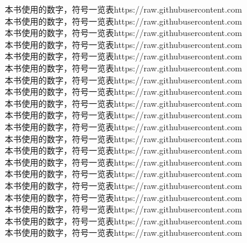 {\cjk\mktsFontfileFlowdejavusansmono{}本书使用的数字，符号一览表https://raw.githubusercontent.com}\\
{\cjk\mktsFontfileHanamina{}本书使用的数字，符号一览表https://raw.githubusercontent.com}\\
{\cjk\mktsFontfileHanaminb{}本书使用的数字，符号一览表https://raw.githubusercontent.com}\\
{\cjk\mktsFontfileSunexta{}本书使用的数字，符号一览表https://raw.githubusercontent.com}\\
{\cjk\mktsFontfileSunextb{}本书使用的数字，符号一览表https://raw.githubusercontent.com}\\
{\cjk\mktsFontfileSunflowerucjkxb{}本书使用的数字，符号一览表https://raw.githubusercontent.com}\\
{\cjk\mktsFontfileUbuntub{}本书使用的数字，符号一览表https://raw.githubusercontent.com}\\
{\cjk\mktsFontfileUbuntubi{}本书使用的数字，符号一览表https://raw.githubusercontent.com}\\
{\cjk\mktsFontfileUbuntuc{}本书使用的数字，符号一览表https://raw.githubusercontent.com}\\
{\cjk\mktsFontfileUbuntul{}本书使用的数字，符号一览表https://raw.githubusercontent.com}\\
{\cjk\mktsFontfileUbuntuli{}本书使用的数字，符号一览表https://raw.githubusercontent.com}\\
{\cjk\mktsFontfileUbuntur{}本书使用的数字，符号一览表https://raw.githubusercontent.com}\\
{\cjk\mktsFontfileUbunturi{}本书使用的数字，符号一览表https://raw.githubusercontent.com}\\
{\cjk\mktsFontfileUbuntumonob{}本书使用的数字，符号一览表https://raw.githubusercontent.com}\\
{\cjk\mktsFontfileUbuntumonobi{}本书使用的数字，符号一览表https://raw.githubusercontent.com}\\
{\cjk\mktsFontfileUbuntumonor{}本书使用的数字，符号一览表https://raw.githubusercontent.com}\\
{\cjk\mktsFontfileUbuntumonori{}本书使用的数字，符号一览表https://raw.githubusercontent.com}\\
{\cjk\mktsFontfileSourcecodeproblack{}本书使用的数字，符号一览表https://raw.githubusercontent.com}\\
{\cjk\mktsFontfileSourcecodeprobold{}本书使用的数字，符号一览表https://raw.githubusercontent.com}\\
{\cjk\mktsFontfileSourcecodeproextralight{}本书使用的数字，符号一览表https://raw.githubusercontent.com}\\
